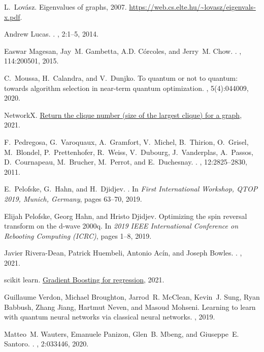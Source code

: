 \documentclass[a4paper,11pt]{article}
\begin{document}
\begin{thebibliography}{10}
L.~Lov{\'a}sz.
\newblock Eigenvalues of graphs, 2007.
\newblock \url{https://web.cs.elte.hu/~lovasz/eigenvals-x.pdf}.

Andrew Lucas.
.
, 2:1--5, 2014.

Easwar Magesan, Jay~M. Gambetta, A.D. C{\' o}rcoles, and Jerry~M. Chow.
.
, 114:200501, 2015.

C.~Moussa, H.~Calandra, and V.~Dunjko.
\newblock To quantum or not to quantum: towards algorithm selection in
  near-term quantum optimization.
, 5(4):044009, 2020.

NetworkX.
\newblock
  \href{https://networkx.org/documentation/networkx-1.10/reference/generated/networkx.algorithms.clique.graph_clique_number.html}{Return
  the clique number (size of the largest clique) for a graph}, 2021.

F.~Pedregosa, G.~Varoquaux, A.~Gramfort, V.~Michel, B.~Thirion, O.~Grisel,
  M.~Blondel, P.~Prettenhofer, R.~Weiss, V.~Dubourg, J.~Vanderplas, A.~Passos,
  D.~Cournapeau, M.~Brucher, M.~Perrot, and E.~Duchesnay.
.
, 12:2825--2830, 2011.

E.~Pelofske, G.~Hahn, and H.~Djidjev.
.
\newblock In {\em First International Workshop, QTOP 2019, Munich, Germany},
  pages 63--70, 2019.

Elijah Pelofske, Georg Hahn, and Hristo Djidjev.
\newblock Optimizing the spin reversal transform on the d-wave 2000q.
\newblock In {\em 2019 IEEE International Conference on Rebooting Computing
  (ICRC)}, pages 1--8, 2019.

Javier Rivera-Dean, Patrick Huembeli, Antonio Ac{\' i}n, and Joseph Bowles.
.
, 2021.

scikit learn.
\newblock
  \href{https://scikit-learn.org/stable/modules/generated/sklearn.ensemble.GradientBoostingRegressor.html}{Gradient
  Boosting for regression}, 2021.

Guillaume Verdon, Michael Broughton, Jarrod~R. McClean, Kevin~J. Sung, Ryan
  Babbush, Zhang Jiang, Hartmut Neven, and Masoud Mohseni.
\newblock Learning to learn with quantum neural networks via classical neural
  networks.
, 2019.

Matteo~M. Wauters, Emanuele Panizon, Glen~B. Mbeng, and Giuseppe~E. Santoro.
.
, 2:033446, 2020.
\end{thebibliography}
\end{document}
